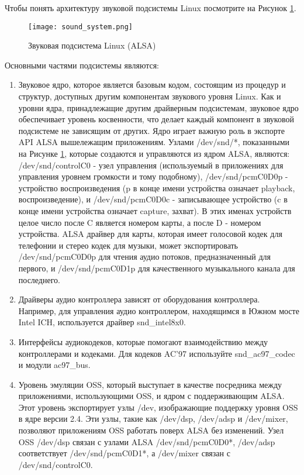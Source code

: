 Чтобы понять архитектуру звуковой подсистемы Linux посмотрите на Рисунок  \ref{image:sound_system}. 

\begin{figure}[h]
  \centering
  \texttt{[image: sound\_system.png]}
  \caption{Звуковая подсистема Linux (ALSA)}
  \label{image:sound_system}
\end{figure}

Основными частями подсистемы являются:

\begin{enumerate}
\item Звуковое ядро, которое является базовым кодом, состоящим из процедур и структур, доступных другим компонентам звукового уровня Linux. Как и уровни ядра, принадлежащие другим драйверным подсистемам, звуковое ядро обеспечивает уровень косвенности, что делает каждый компонент в звуковой подсистеме не зависящим от других. Ядро играет важную роль в экспорте API ALSA вышележащим приложениям. Узлами /dev/snd/*, показанными на Рисунке \ref{image:sound_system}, которые создаются и управляются из ядром ALSA, являются: /dev/snd/controlC0 - узел управления (используемый в приложениях для управления уровнем громкости и тому подобному), /dev/snd/pcmC0D0p - устройство воспроизведения (p в конце имени устройства означает playback, воспроизведение), и /dev/snd/pcmC0D0c - записывающее устройство (c в конце имени устройства означает capture, захват). В этих именах устройств целое число после C является номером карты, а после D - номером устройства. ALSA драйвер для карты, которая имеет голосовой кодек для телефонии и стерео кодек для музыки, может экспортировать /dev/snd/pcmC0D0p для чтения аудио потоков, предназначенный для первого, и /dev/snd/pcmC0D1p для качественного музыкального канала для последнего.
 
\item Драйверы аудио контроллера зависят от оборудования контроллера. Например, для управления аудио контроллером, находящимся в Южном мосте Intel ICH, используется драйвер snd\_intel8x0.
 
\item Интерфейсы аудиокодеков, которые помогают взаимодействию между контроллерами и кодеками. Для кодеков AC'97 используйте snd\_ac97\_codec и модули ac97\_bus.
 
\item Уровень эмуляции OSS, который выступает в качестве посредника между приложениями, использующими OSS, и ядром с поддерживающим ALSA. Этот уровень экспортирует узлы /dev, изображающие поддержку уровня OSS в ядре версии 2.4. Эти узлы, такие как /dev/dsp, /dev/adsp и /dev/mixer, позволяют приложениям OSS работать поверх ALSA без изменений. Узел OSS /dev/dsp связан с узлами ALSA /dev/snd/pcmC0D0*, /dev/adsp соответствует /dev/snd/pcmC0D1*, а /dev/mixer связан с /dev/snd/controlC0.
 

\end{enumerate}
